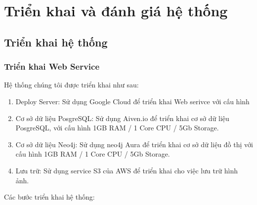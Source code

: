 \section{Triển khai và đánh giá hệ thống}
\subsection{Triển khai hệ thống}
\subsubsection{Triển khai Web Service}
Hệ thống chúng tôi được triển khai như sau:
\begin{enumerate}[-]
    \item Deploy Server: Sử dụng Google Cloud để triển khai Web serivce với cấu hình 
    \item Cơ sở dữ liệu PosgreSQL: Sử dụng Aiven.io để triển khai cơ sở dữ liệu PosgreSQL, với cấu hình 1GB RAM / 1 Core CPU / 5Gb Storage.
    \item Cơ sở dữ liệu Neo4j: Sử dụng  neo4j Aura để triển khai cơ sở dữ liệu đồ thị với cấu hình 1GB RAM / 1 Core CPU / 5Gb Storage.
    \item Lưu trữ: Sử dụng service S3 của AWS để triển khai cho việc lưu trữ hình ảnh.
\end{enumerate}
Các bước triển khai hệ thống:

